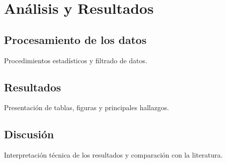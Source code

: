 \chapter{Análisis y Resultados}
\section{Procesamiento de los datos}
Procedimientos estadísticos y filtrado de datos.
\section{Resultados}
Presentación de tablas, figuras y principales hallazgos.
\section{Discusión}
Interpretación técnica de los resultados y comparación con la literatura.
